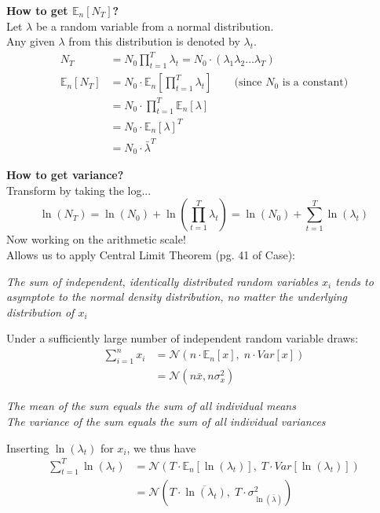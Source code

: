 \documentclass{article}
\begin{document}
\textbf{How to get $\mathbb{E}_n[N_T]$?}\\
Let $\lambda$ be a random variable from a normal distribution.\\
Any given $\lambda$ from this distribution is denoted by $\lambda_t$.
\begin{align*}
	N_T &= N_0 \prod_{t=1}^T \lambda_t = N_0 \cdot (\lambda_1 \lambda_2 \dots \lambda_T)\\
	\mathbb{E}_n[N_T] &= N_0 \cdot \mathbb{E}_n\left[\prod_{t=1}^T \lambda_t \right] \qquad \text{(since } N_0 \text{ is a constant)}\\
		& = N_0 \cdot \prod_{t=1}^T \mathbb{E}_n[\lambda]\\
		& = N_0 \cdot \mathbb{E}_n[\lambda]^T\\
		& = N_0 \cdot \bar{\lambda}^T
\end{align*}

\textbf{How to get variance?}\\
Transform by taking the log...\\
\begin{equation*}
	\ln(N_T)=\ln(N_0)+\ln\left(\prod_{t=1}^T \lambda_t\right) =\ln(N_0)+ \boxed{ \sum_{t=1}^T \ln(\lambda_t)}
\end{equation*}
Now working on the arithmetic scale!\\
Allows us to apply Central Limit Theorem (pg. 41 of Case):
\begin{center}
	\emph{The sum of independent, identically distributed random variables $x_i$ tends to asymptote to the normal density distribution, no matter the underlying distribution of $x_i$}
\end{center}

Under a sufficiently large number of independent random variable draws:
\begin{align*}
	\boxed{\sum_{i=1}^n x_i} & = \mathcal{N}(n\cdot \mathbb{E}_n[x] , \; n\cdot Var[x])\\
	& = \mathcal{N}(n \bar{x}, n \sigma_{x}^2)
\end{align*}

\begin{center}
\emph{The mean of the sum equals the sum of all individual means}\\
\emph{The variance of the sum equals the sum of all individual variances}\\
\end{center}
Inserting $\ln (\lambda_t)$ for $x_i$, we thus have
\begin{align*}
	\sum_{t=1}^T \ln (\lambda_t) & =  \mathcal{N}(T\cdot \mathbb{E}_n[\ln(\lambda_t)] , \; T\cdot Var[\ln(\lambda_t)])\\
	& = \mathcal{N}(T\cdot \overline{\ln(\lambda_t)},\; T\cdot\sigma_{\ln (\bar{\lambda})}^2)
\end{align*}
\end{document}
